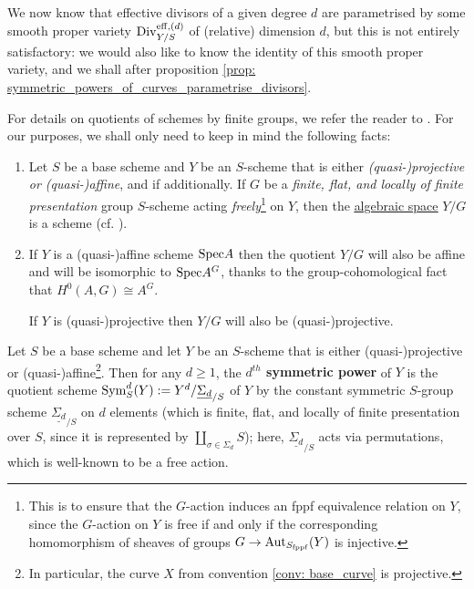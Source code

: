         We now know that effective divisors of a given degree $d$ are parametrised by some smooth proper variety $\mathrm{Div}_{Y/S}^{\mathrm{eff}, (d)}$ of (relative) dimension $d$, but this is not entirely satisfactory: we would also like to know the identity of this smooth proper variety, and we shall after proposition \ref{prop: symmetric_powers_of_curves_parametrise_divisors}.
        \begin{remark} \label{remark: quotients_of_schemes_by_finite_group_schemes}
            For details on quotients of schemes by finite groups, we refer the reader to \cite[Expos\'e V]{SGA1}. For our purposes, we shall only need to keep in mind the following facts: 
                \begin{enumerate}
                    \item Let $S$ be a base scheme and $Y$ be an $S$-scheme that is either \textit{(quasi-)projective or (quasi-)affine}, and if additionally. If $G$ be a \textit{finite, flat, and locally of finite presentation} group $S$-scheme acting \textit{freely}\footnote{This is to ensure that the $G$-action induces an fppf equivalence relation on $Y$, since the $G$-action on $Y$ is free if and only if the corresponding homomorphism of sheaves of groups $G \to \mathrm{Aut}_{S_{\mathrm{fppf}}}(Y)$ is injective.} on $Y$, then the \href{https://stacks.math.columbia.edu/tag/025X}{\underline{algebraic space}} $Y/G$ is a scheme (cf. \cite[\href{https://stacks.math.columbia.edu/tag/07S7}{Tag 07S7}]{stacks}). 
                    \item If $Y$ is a (quasi-)affine scheme $\mathrm{Spec} A$ then the quotient $Y/G$ will also be affine and will be isomorphic to $\mathrm{Spec} A^G$, thanks to the group-cohomological fact that $H^0(A, G) \cong A^G$. 
                    
                    If $Y$ is (quasi-)projective then $Y/G$ will also be (quasi-)projective.
                \end{enumerate}
        \end{remark}
        \begin{definition} \label{def: symmetric_powers_of_schemes}
            Let $S$ be a base scheme and let $Y$ be an $S$-scheme that is either (quasi-)projective or (quasi-)affine\footnote{In particular, the curve $X$ from convention \ref{conv: base_curve} is projective.}. Then for any $d \geq 1$, the \textbf{$d^{th}$ symmetric power} of $Y$ is the quotient scheme $\mathrm{Sym}^d_S(Y) := Y^d/\underline{\Sigma_d}_{/S}$ of $Y$ by the constant symmetric $S$-group scheme $\underline{\Sigma_d}_{/S}$ on $d$ elements (which is finite, flat, and locally of finite presentation over $S$, since it is represented by $\coprod_{\sigma \in \Sigma_d} S$); here, $\underline{\Sigma_d}_{/S}$ acts via permutations, which is well-known to be a free action.
        \end{definition}
